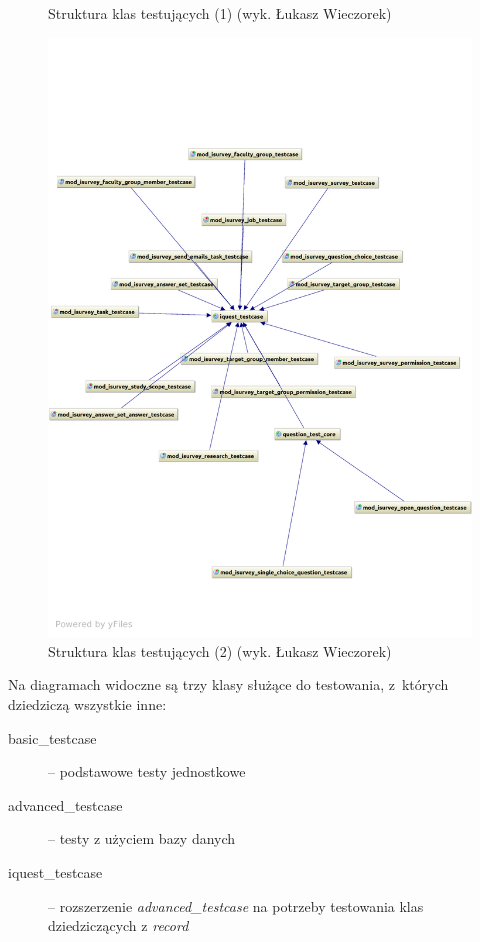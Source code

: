 \newpage
\begin{figure}[H]
\begin{center}
 
\end{center}
\caption{Struktura klas testujących (1) (wyk. Łukasz Wieczorek)}\label{fig:tests1}
\end{figure}
\newpage
\begin{figure}[H]
\begin{center}
\includegraphics[width=\textwidth]{figures/lw/tests2.pdf} 
\end{center}
\caption{Struktura klas testujących (2) (wyk. Łukasz Wieczorek)}\label{fig:tests2}
\end{figure}
\newpage

Na diagramach widoczne są trzy klasy służące do testowania, z~których dziedziczą wszystkie inne:
\begin{description}
\item[basic\_testcase] -- podstawowe testy jednostkowe
\item[advanced\_testcase] -- testy z użyciem bazy danych
\item[iquest\_testcase] -- rozszerzenie \textit{advanced\_testcase} na potrzeby testowania klas dziedziczących z \emph{record}
\end{description}

